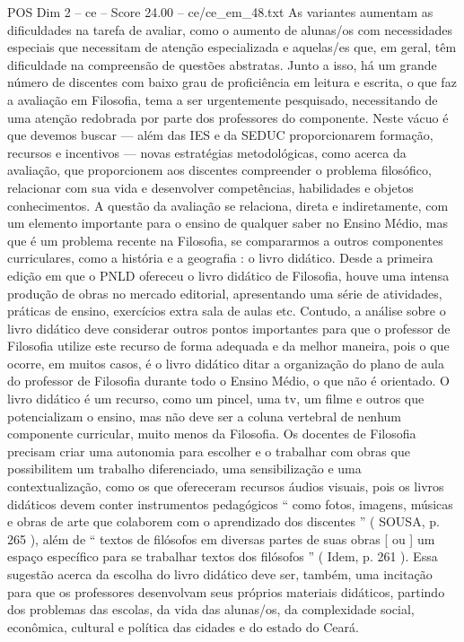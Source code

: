 \begin{textsample}{POS Dim 2 – ce – Score 24.00 – ce/ce\_em\_48.txt}
As variantes aumentam as dificuldades na tarefa de avaliar, como o aumento de alunas/os com necessidades especiais que necessitam de atenção especializada e aquelas/es que, em geral, têm dificuldade na compreensão de questões abstratas.
Junto a isso, há um grande número de discentes com baixo grau de proficiência em leitura e escrita, o que faz a avaliação em Filosofia, tema a ser urgentemente pesquisado, necessitando de uma atenção redobrada por parte dos professores do componente.
Neste vácuo é que devemos buscar — além das IES e da SEDUC proporcionarem formação, recursos e incentivos — novas estratégias metodológicas, como acerca da avaliação, que proporcionem aos discentes compreender o problema filosófico, relacionar com sua vida e desenvolver competências, habilidades e objetos conhecimentos.
A questão da avaliação se relaciona, direta e indiretamente, com um elemento importante para o ensino de qualquer saber no Ensino Médio, mas que é um problema recente na Filosofia, se compararmos a outros componentes curriculares, como a história e a geografia : o livro didático.
Desde a primeira edição em que o PNLD ofereceu o livro didático de Filosofia, houve uma intensa produção de obras no mercado editorial, apresentando uma série de atividades, práticas de ensino, exercícios extra sala de aulas etc.
Contudo, a análise sobre o livro didático deve considerar outros pontos importantes para que o professor de Filosofia utilize este recurso de forma adequada e da melhor maneira, pois o que ocorre, em muitos casos, é o livro didático ditar a organização do plano de aula do professor de Filosofia durante todo o Ensino Médio, o que não é orientado.
O livro didático é um recurso, como um pincel, uma tv, um filme e outros que potencializam o ensino, mas não deve ser a coluna vertebral de nenhum componente curricular, muito menos da Filosofia.
Os docentes de Filosofia precisam criar uma autonomia para escolher e o trabalhar com obras que possibilitem um trabalho diferenciado, uma sensibilização e uma contextualização, como os que ofereceram recursos áudios visuais, pois os livros didáticos devem conter instrumentos pedagógicos “ como fotos, imagens, músicas e obras de arte que colaborem com o aprendizado dos discentes ” ( SOUSA, p. 265 ), além de “ textos de filósofos em diversas partes de suas obras [ ou ] um espaço específico para se trabalhar textos dos filósofos ” ( Idem, p. 261 ).
Essa sugestão acerca da escolha do livro didático deve ser, também, uma incitação para que os professores desenvolvam seus próprios materiais didáticos, partindo dos problemas das escolas, da vida das alunas/os, da complexidade social, econômica, cultural e política das cidades e do estado do Ceará.

\end{textsample}
